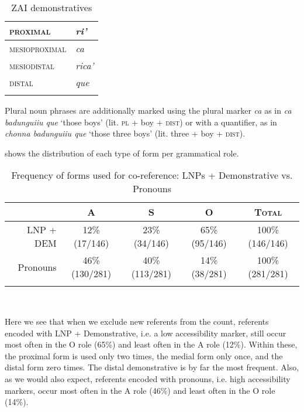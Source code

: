 \begin{table}  

\caption{{ZAI demonstratives}}
\begin{tabular}{| l | l |}
\midrule
\textsc{proximal} & \textit{ri'} \\

\midrule
\textsc{mesioproximal} & \textit{ca} \\

\midrule
\textsc{mesiodistal} & \textit{rica'} \\

\midrule
\textsc{distal} & \textit{que} \\

\lspbottomrule
\end{tabular}
\label{zdmn}

\end{table}
Plural noun phrases are additionally marked using the plural marker \textit{ca} as in \textit{ca badunguiiu que} `those boys' (lit. \textsc{pl} + boy + \textsc{dist}) or with a quantifier, as in \textit{chonna badunguiiu que} `those three boys' (lit. three + boy + \textsc{dist}).

 shows the distribution of each type of form per grammatical role.

\begin{table}

\caption{{Frequency of forms used for co-reference: LNPs + Demonstrative vs. Pronouns}}
\begin{tabular}{| r  c  c  c  c }
\lsptoprule
 & \textsc{A} & \textsc{S} & \textsc{O} & \textsc{Total} \\

\midrule
LNP + DEM & 12{\%} (17/146) & 23{\%} (34/146) & 65{\%} (95/146) & 100{\%} (146/146)  \\

\midrule
Pronouns & 46{\%} (130/281) & 40{\%} (113/281) & 14{\%} (38/281) & 100{\%} (281/281)  \\

\lspbottomrule
\end{tabular}\\
\label{coreferenceforms}

\end{table}
Here we see that when we exclude new referents from the count, referents encoded with LNP + Demonstrative, i.e. a low accessibility marker, still occur most often in the O role (65{\%}) and least often in the A role (12{\%}). Within these, the proximal form is used only two times, the medial form only once, and the distal form zero times. The distal demonstrative is by far the most frequent. Also, as we would also expect, referents encoded with pronouns, i.e. high accessibility markers, occur most often in the A role (46{\%}) and least often in the O role (14{\%}). 

